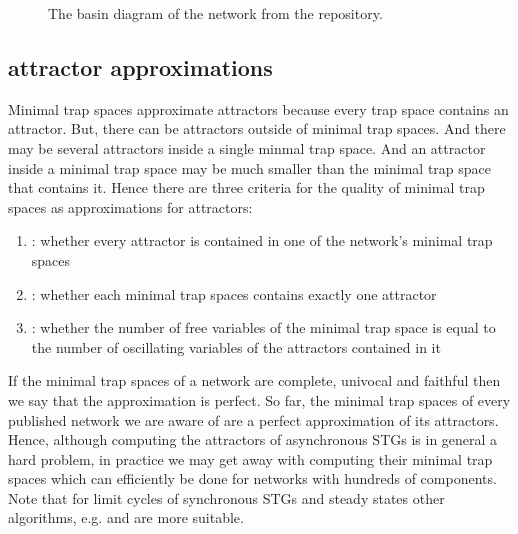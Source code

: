 \documentclass[letterpaper,10pt,english]{sphinxmanual}
\begin{document}
\begin{figure}[htbp]
\centering
\capstart

\noindent{}
\caption{The basin diagram of the network  from the repository.}\label{\detokenize{Manual:figure26}}\label{\detokenize{Manual:id30}}\end{figure}


\subsection{attractor approximations}
\label{\detokenize{Manual:attractor-approximations}}
Minimal trap spaces approximate attractors because every trap space contains an attractor.
But, there can be attractors outside of minimal trap spaces.
And there may be several attractors inside a single minmal trap space.
And an attractor inside a minimal trap space may be much smaller than the minimal trap space that contains it.
Hence there are three criteria for the quality of minimal trap spaces as approximations for attractors:
\begin{enumerate}
\item {} 
: whether every attractor is contained in one of the network’s minimal trap spaces

\item {} 
: whether each minimal trap spaces contains exactly one attractor

\item {} 
: whether the number of free variables of the minimal trap space is equal to the number of oscillating variables of the attractors contained in it

\end{enumerate}

If the minimal trap spaces of a network are complete, univocal and faithful then we say that the approximation is perfect.
So far, the minimal trap spaces of every published network we are aware of are a perfect approximation of its attractors.
Hence, although computing the attractors of asynchronous STGs is in general a hard problem,
in practice we may get away with computing their minimal trap spaces which can efficiently be done for networks with hundreds of components.
Note that for limit cycles of synchronous STGs and steady states other algorithms, e.g. {\hyperref[\detokenize{Bibliography:dubrova2011}]{}} and  are more suitable.
\end{document}
